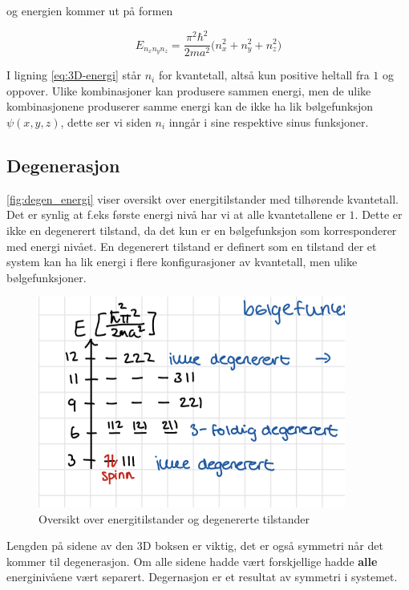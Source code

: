 og energien kommer ut på formen 

\begin{equation}
    \label{eq:3D-energi}
    E_{n_xn_yn_z} = \frac{\pi^2\hbar^2}{2ma^2}
    \bigg(
    n_x^2+n_y^2+n_z^2
    \bigg)
\end{equation}

I ligning \ref{eq:3D-energi} står $n_i$ for kvantetall, altså kun positive heltall fra $1$ og oppover. Ulike kombinasjoner kan produsere sammen energi, men de ulike kombinasjonene produserer samme energi kan de ikke ha lik bølgefunksjon $\psi(x,y,z)$, dette ser vi siden $n_i$ inngår i sine respektive sinus funksjoner.

\subsection{Degenerasjon}
\label{sec:tema3_2}
\autoref{fig:degen_energi} viser oversikt over energitilstander med tilhørende kvantetall. Det er synlig at f.eks første energi nivå har vi at alle kvantetallene er $1$. Dette er ikke en degenerert tilstand, da det kun er en bølgefunksjon som korresponderer med energi nivået. En degenerert tilstand er definert som en tilstand der et system kan ha lik energi i flere konfigurasjoner av kvantetall, men ulike bølgefunksjoner. 

\begin{figure}[!htb]
    \includegraphics[width=0.9\textwidth]{Bilder/SamtaleTema3/3D partikkel i boks/degenererteTilstander.png}
    \caption{Oversikt over energitilstander og degenererte tilstander}
    \label{fig:degen_energi}
\end{figure}

Lengden på sidene av den 3D boksen er viktig, det er også symmetri når det kommer til degenerasjon. Om alle sidene hadde vært forskjellige hadde \textbf{alle} energinivåene vært separert. \color{red} Degernasjon er et resultat av symmetri i systemet. \color{black}

